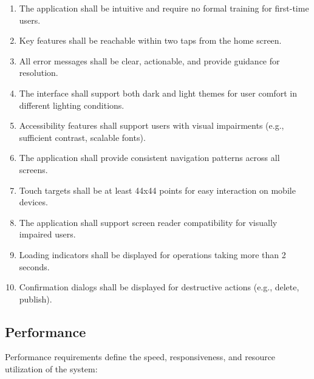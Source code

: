 \documentclass[12pt,a4paper]{article}
\begin{document}
\begin{enumerate}[leftmargin=*, label=\textbf{US-\arabic*.}, itemsep=4pt]
  \item The application shall be intuitive and require no formal training for first-time users.
  \item Key features shall be reachable within two taps from the home screen.
  \item All error messages shall be clear, actionable, and provide guidance for resolution.
  \item The interface shall support both dark and light themes for user comfort in different lighting conditions.
  \item Accessibility features shall support users with visual impairments (e.g., sufficient contrast, scalable fonts).
  \item The application shall provide consistent navigation patterns across all screens.
  \item Touch targets shall be at least 44x44 points for easy interaction on mobile devices.
  \item The application shall support screen reader compatibility for visually impaired users.
  \item Loading indicators shall be displayed for operations taking more than 2 seconds.
  \item Confirmation dialogs shall be displayed for destructive actions (e.g., delete, publish).
\end{enumerate}

\subsection{Performance}

Performance requirements define the speed, responsiveness, and resource utilization of the system:
\end{document}
